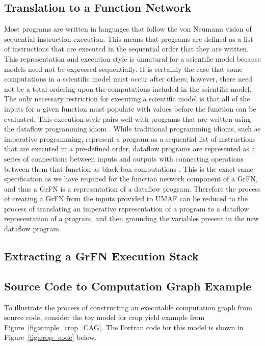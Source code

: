 \subsection{Translation to a Function Network \label{sec:trans_to_dfm}}
Most programs are written in languages that follow the von Neumann vision of sequential instruction execution.
This means that programs are defined as a list of instructions that are executed in the sequential order that they are written.
This representation and execution style is unnatural for a scientific model because models need not be expressed sequentially.
It is certainly the case that some computations in a scientific model must occur after others; however, there need not be a total ordering upon the computations included in the scientific model.
The only necessary restriction for executing a scientific model is that all of the inputs for a given function must populate with values before the function can be evaluated.
This execution style pairs well with programs that are written using the dataflow programming idiom \citep{johnston2004dataflowadvances}.
While traditional programming idioms, such as imperative programming, represent a program as a sequential list of instructions that are executed in a pre-defined order, dataflow programs are represented as a series of connections between inputs and outputs with connecting operations between them that function as black-box computations \citep{wadge1985lucid}.
This is the exact same specification as we have required for the function network component of a GrFN, and thus a GrFN is a representation of a dataflow program.
Therefore the process of creating a GrFN from the inputs provided to UMAF can be reduced to the process of translating an imperative representation of a program to a dataflow representation of a program, and then grounding the variables present in the new dataflow program.




\subsection{Extracting a GrFN Execution Stack \label{sec:exec_graph_extraction}}
\subsection{Source Code to Computation Graph Example\label{sec:code_to_grfn}}
To illustrate the process of constructing an executable computation graph from source code, consider the toy model for crop yield example from Figure~\ref{fig:simple_crop_CAG}.
The Fortran code for this model is shown in Figure~\ref{fig:crop_code} below.


